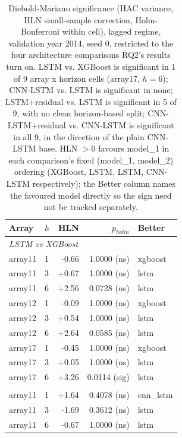 \begin{table}[t]
  \centering
  \small
  \caption{Diebold-Mariano significance (HAC variance, HLN small-sample correction, Holm-Bonferroni within cell), lagged regime, validation year 2014, seed 0, restricted to the four architecture comparisons RQ2's results turn on. LSTM vs. XGBoost is significant in 1 of 9 array x horizon cells (array17, $h=6$); CNN-LSTM vs. LSTM is significant in none; LSTM+residual vs. LSTM is significant in 5 of 9, with no clean horizon-based split; CNN-LSTM+residual vs. CNN-LSTM is significant in all 9, in the direction of the plain CNN-LSTM base. HLN $>0$ favours model\_1 in each comparison's fixed (model\_1, model\_2) ordering (XGBoost, LSTM, LSTM, CNN-LSTM respectively); the Better column names the favoured model directly so the sign need not be tracked separately.}
  \label{tab:T6}
  \begin{tabular}{ll rrl}
    \toprule
    Array & $h$ & HLN & $p_{holm}$ & Better \\
    \midrule
    \multicolumn{5}{l}{\textit{LSTM vs XGBoost}} \\
    array11 & 1 & -0.66 & 1.0000 (ns) & xgboost \\
    array11 & 3 & +0.67 & 1.0000 (ns) & lstm \\
    array11 & 6 & +2.56 & 0.0728 (ns) & lstm \\
    array12 & 1 & -0.09 & 1.0000 (ns) & xgboost \\
    array12 & 3 & +0.54 & 1.0000 (ns) & lstm \\
    array12 & 6 & +2.64 & 0.0585 (ns) & lstm \\
    array17 & 1 & -0.45 & 1.0000 (ns) & xgboost \\
    array17 & 3 & +0.05 & 1.0000 (ns) & lstm \\
    array17 & 6 & +3.26 & 0.0114 (sig) & lstm \\
    \addlinespace
    \multicolumn{5}{l}{\textit{CNN-LSTM vs LSTM}} \\
    array11 & 1 & +1.64 & 0.4078 (ns) & cnn_lstm \\
    array11 & 3 & -1.69 & 0.3612 (ns) & lstm \\
    array11 & 6 & -0.67 & 1.0000 (ns) & lstm \\

\end{tabular}
\end{table}
